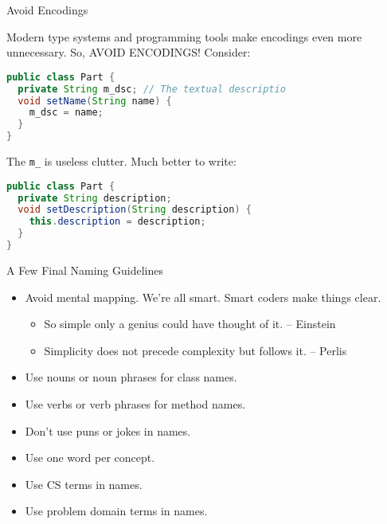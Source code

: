 \documentclass{beamer}
\begin{document}
\begin{frame}[fragile]{Avoid Encodings}


Modern type systems and programming tools make encodings even more unnecessary.  So, AVOID ENCODINGS!  Consider:
\begin{lstlisting}[language=Java]
public class Part {
  private String m_dsc; // The textual descriptio
  void setName(String name) {
    m_dsc = name;
  }
}
\end{lstlisting}
The {\tt m\_} is useless clutter.  Much better to write:
\begin{lstlisting}[language=Java]
public class Part {
  private String description;
  void setDescription(String description) {
    this.description = description;
  }
}
\end{lstlisting}


\end{frame}

\begin{frame}[fragile]{A Few Final Naming Guidelines}


\begin{itemize}
\item Avoid mental mapping. We're all smart.  Smart coders make things clear.
\begin{itemize}
\item So simple only a genius could have thought of it. -- Einstein
\item Simplicity does not precede complexity but follows it. -- Perlis
\end{itemize}
\item Use nouns or noun phrases for class names.
\item Use verbs or verb phrases for method names.
\item Don't use puns or jokes in names.
\item Use one word per concept.
\item Use CS terms in names.
\item Use problem domain terms in names.
\end{itemize}


\end{frame}







\end{document}
